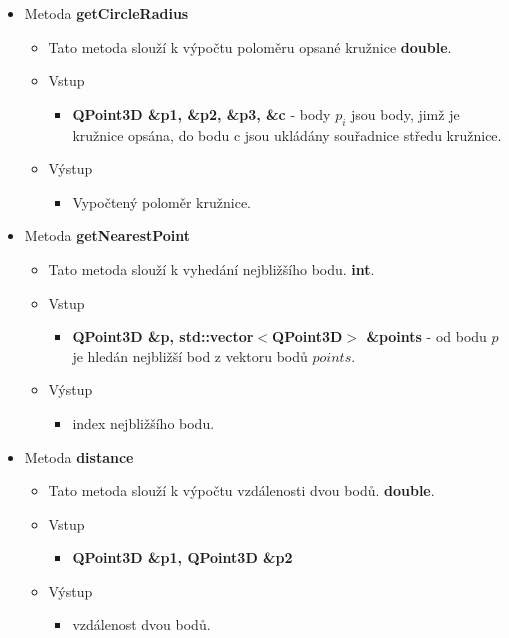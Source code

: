 \documentclass[a4paper, 12pt]{article}
\begin{document}
\begin{itemize}
	\item Metoda \textbf{getCircleRadius}
		\begin{itemize}
			\item Tato metoda slouží k výpočtu poloměru opsané kružnice \textbf{double}.
			\item Vstup
				\begin{itemize}
					\item \textbf{QPoint3D \&p1, \&p2, \&p3, \&c} - body $p_i$ jsou body, jimž je kružnice opsána, do bodu c jsou ukládány souřadnice středu kružnice.
				\end{itemize}
			\item Výstup
				\begin{itemize}	
					\item Vypočtený poloměr kružnice.
				\end{itemize}
		\end{itemize}	
		
	\item Metoda \textbf{getNearestPoint}		
	\begin{itemize}
		\item Tato metoda slouží k vyhedání nejbližšího bodu. \textbf{int}.
		\item Vstup
		\begin{itemize}
			\item \textbf{QPoint3D \&p, std::vector$<$QPoint3D$>$ \&points} - od bodu $p$ je hledán nejbližší bod z vektoru bodů $points$.
		\end{itemize}
		\item Výstup
		\begin{itemize}	
			\item index nejbližšího bodu.
		\end{itemize}
	\end{itemize}	
	
	\item Metoda \textbf{distance}		
	\begin{itemize}
		\item Tato metoda slouží k výpočtu vzdálenosti dvou bodů. \textbf{double}.
		\item Vstup
		\begin{itemize}
			\item \textbf{QPoint3D \&p1, QPoint3D \&p2} 
		\end{itemize}
		\item Výstup
		\begin{itemize}	
			\item vzdálenost dvou bodů.
		\end{itemize}
	\end{itemize}


\end{itemize}
\end{document}
